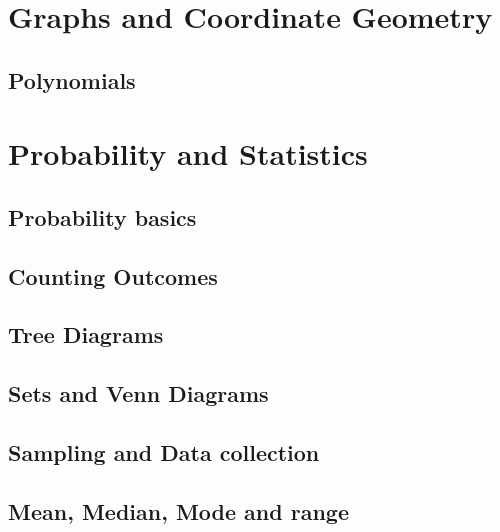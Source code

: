 \documentclass[
]{book}
\begin{document}
\hypertarget{graphs-and-coordinate-geometry}{%
\chapter{Graphs and Coordinate Geometry}\label{graphs-and-coordinate-geometry}}

\hypertarget{polynomials}{%
\section{Polynomials}\label{polynomials}}

\hypertarget{probability-and-statistics}{%
\chapter{Probability and Statistics}\label{probability-and-statistics}}

\hypertarget{probability-basics}{%
\section{Probability basics}\label{probability-basics}}

\hypertarget{counting-outcomes}{%
\section{Counting Outcomes}\label{counting-outcomes}}

\hypertarget{tree-diagrams}{%
\section{Tree Diagrams}\label{tree-diagrams}}

\hypertarget{sets-and-venn-diagrams}{%
\section{Sets and Venn Diagrams}\label{sets-and-venn-diagrams}}

\hypertarget{sampling-and-data-collection}{%
\section{Sampling and Data collection}\label{sampling-and-data-collection}}

\hypertarget{mean-median-mode-and-range}{%
\section{Mean, Median, Mode and range}\label{mean-median-mode-and-range}}
\end{document}
